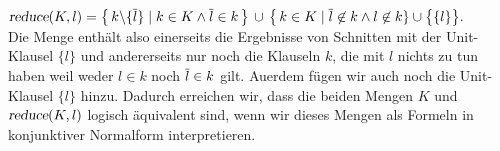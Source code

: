 \hspace*{1.3cm}
$\textsl{reduce}(K,l)  = 
 \bigl\{\, k \backslash \{\overline{l}\} \;|\; k \in K \wedge \overline{l} \in k \,\bigr\} 
       \,\cup\, \bigl\{\, k \in K \mid \overline{l} \not\in k \wedge l \not\in k \} \cup \bigl\{\{l\}\bigr\}.
$
\\[0.2cm]
Die Menge enth\"{a}lt also einerseits die Ergebnisse von Schnitten mit
der Unit-Klausel $\{l\}$ und andererseits nur noch die Klauseln $k$,
die mit $l$ nichts zu tun haben weil weder $l \in k$ noch $\overline{l} \in k$
gilt.  Au\3erdem f\"{u}gen wir auch noch die Unit-Klausel $\{l\}$ hinzu.
Dadurch erreichen wir, dass die beiden Mengen $K$ und $\textsl{reduce}(K,l)$
logisch \"{a}quivalent sind, wenn wir dieses Mengen als Formeln in konjunktiver Normalform
interpretieren.  



